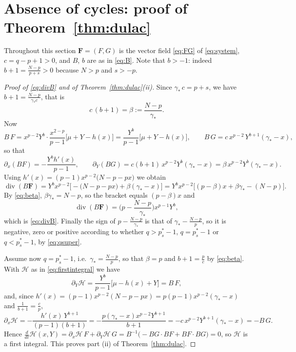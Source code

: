 \documentclass[11pt,reqno]{amsart}
\numberwithin{equation}{section}
\theoremstyle{plain}
\theoremstyle{definition}
\newcommand{\gs}{\gamma_{*}}
\DeclareMathOperator{\dv}{div}
\begin{document}
\section{Absence of cycles: proof of Theorem~\ref{thm:dulac}}\label{sec:dulac}

Throughout this section $\mathbf F=(F,G)$ is the vector field \eqref{eq:FG} of
\eqref{eq:system}, $c=q-p+1>0$, and $B$, $b$ are as in \eqref{eq:B}. Note that
$b>-1$: indeed $b+1=\frac{N-p}{p+s}>0$ because $N>p$ and $s>-p$.

\begin{proof}[Proof of \eqref{eq:divB} and of Theorem~\ref{thm:dulac}(ii)]
Since $\gs\,c=p+s$, we have $b+1=\frac{N-p}{\gs c}$, that is
\begin{equation}\label{eq:beta}
c\,(b+1)=\beta:=\frac{N-p}{\gs}.
\end{equation}
Now
\[
B\,F=x^{p-2}Y^{b}\cdot\frac{x^{2-p}}{p-1}\big[\mu+Y-h(x)\big]
=\frac{Y^{b}}{p-1}\big[\mu+Y-h(x)\big],
\qquad
B\,G=c\,x^{p-2}\,Y^{b+1}(\gs-x),
\]
so that
\[
\partial_{x}(BF)=-\frac{Y^{b}h'(x)}{p-1},
\qquad
\partial_{Y}(BG)=c(b+1)\,x^{p-2}Y^{b}(\gs-x)
=\beta\,x^{p-2}Y^{b}(\gs-x).
\]
Using $h'(x)=(p-1)x^{p-2}\big(N-p-px\big)$ we obtain
\[
\dv(B\mathbf F)=Y^{b}x^{p-2}\Big[-\big(N-p-px\big)+\beta(\gs-x)\Big]
=Y^{b}x^{p-2}\Big[(p-\beta)x+\beta\gs-(N-p)\Big].
\]
By \eqref{eq:beta}, $\beta\gs=N-p$, so the bracket equals $(p-\beta)x$ and
\[
\dv(B\mathbf F)=\Big(p-\frac{N-p}{\gs}\Big)x^{p-1}Y^{b},
\]
which is \eqref{eq:divB}. Finally the sign of $p-\frac{N-p}{\gs}$ is that of
$\gs-\frac{N-p}{p}$, so it is negative, zero or positive according to whether
$q>p^{*}_{s}-1$, $q=p^{*}_{s}-1$ or $q<p^{*}_{s}-1$, by \eqref{eq:qsuper}.

Assume now $q=p^{*}_{s}-1$, i.e.\ $\gs=\frac{N-p}{p}$, so that $\beta=p$ and
$b+1=\frac{p}{c}$ by \eqref{eq:beta}. With $\mathcal H$ as in
\eqref{eq:firstintegral} we have
\[
\partial_{Y}\mathcal H=\frac{Y^{b}}{p-1}\big[\mu-h(x)+Y\big]=B\,F ,
\]
and, since $h'(x)=(p-1)x^{p-2}(N-p-px)=p(p-1)x^{p-2}(\gs-x)$ and
$\frac{1}{b+1}=\frac cp$,
\[
\partial_{x}\mathcal H=-\frac{h'(x)\,Y^{b+1}}{(p-1)(b+1)}
=-\frac{p(\gs-x)x^{p-2}Y^{b+1}}{b+1}=-c\,x^{p-2}Y^{b+1}(\gs-x)=-B\,G .
\]
Hence $\frac{d}{dt}\mathcal H(x,Y)=\partial_{x}\mathcal H\,F
+\partial_{Y}\mathcal H\,G=B^{-1}\big(-BG\cdot BF+BF\cdot BG\big)=0$, so
$\mathcal H$ is a first integral. This proves part (ii) of
Theorem~\ref{thm:dulac}.
\end{proof}
\end{document}
